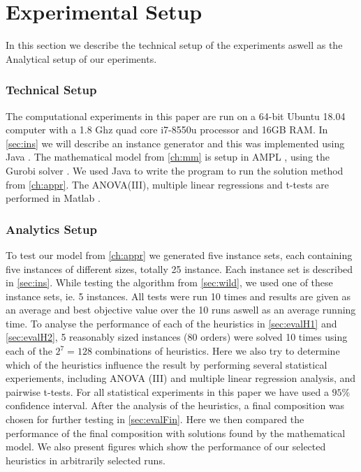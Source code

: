 \documentclass[../main.tex]{subfiles}
\begin{document}
\section{Experimental Setup}
\label{sec:setup}
In this section we describe the technical setup of the experiments aswell as the Analytical setup of our eperiments.
\subsubsection{Technical Setup}
The computational experiments in this paper are run on a 64-bit Ubuntu 18.04 computer with a 1.8 Ghz quad core i7-8550u processor and 16GB RAM. 
In \cref{sec:ins} we will describe an instance generator and this was implemented using Java \citep{java}.
The mathematical model from \cref{ch:mm} is setup in AMPL \citep{ampl}, using the Gurobi solver \citep{gurobi}.  
We used Java \citep{java} to write the program to run the solution method from \cref{ch:appr}.
The ANOVA(III), multiple linear regressions and t-tests are performed in Matlab \citep{matlab}.

\subsubsection{Analytics Setup}
To test our model from \ref{ch:appr} we generated five instance sets, each containing five instances of different sizes, totally 25 instance. 
Each instance set is described in \cref{sec:ins}.
While testing the algorithm from \cref{sec:wild}, we used one of these instance sets, ie. 5 instances. 
All tests were run 10 times and results are given as an average and best objective value over the 10 runs aswell as an average running time.
To analyse the performance of each of the heuristics in \cref{sec:evalH1} and \cref{sec:evalH2}, 5 reasonably sized instances (80 orders) were solved 10 times using each of the $2^7 = 128$ combinations of heuristics.
Here we also try to determine which of the heuristics influence the result by performing several statistical experiements, including ANOVA (III) and multiple linear regression analysis, and pairwise t-tests.
For all statistical experiments in this paper we have used a $95\%$ confidence interval.
After the analysis of the heuristics, a final composition was chosen for further testing in \cref{sec:evalFin}.
Here we then compared the performance of the final composition with solutions found by the mathematical model. 
We also present figures which show the performance of our selected heuristics in arbitrarily selected runs.
\end{document}
